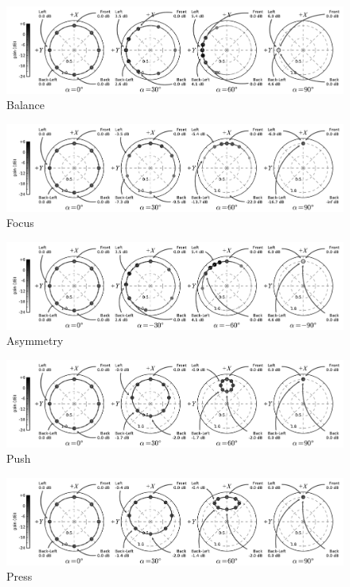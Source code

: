 \documentclass[12pt]{article}
\begin{document}
\begin{figure}
\centering
\includegraphics[width=1.\textwidth]{balance_fig.pdf}
\caption{Balance}
\label{fig:balanceFig}
\end{figure}

\begin{figure}
\centering
\includegraphics[width=1.\textwidth]{focus_fig.pdf}
\caption{Focus}
\label{fig:focusFig}
\end{figure}

\begin{figure}
\centering
\includegraphics[width=1.\textwidth]{asymmetry_fig.pdf}
\caption{Asymmetry}
\label{fig:asymmetryFig}
\end{figure}

\begin{figure}
\centering
\includegraphics[width=1.\textwidth]{push_fig.pdf}
\caption{Push}
\label{fig:pushFig}
\end{figure}

\begin{figure}
\centering
\includegraphics[width=1.\textwidth]{press_fig.pdf}
\caption{Press}
\label{fig:pressFig}
\end{figure}
\end{document}
